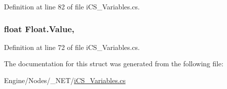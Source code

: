 Definition at line 82 of file i\+C\+S\+\_\+\+Variables.\+cs.

\hypertarget{struct_float_abf7787573f5748d6b7d6fdea53295c9f}{
\subsubsection[{Value}]{\setlength{\rightskip}{0pt plus 5cm}float Float.\+Value\hspace{0.3cm}{\ttfamily [get]}, {\ttfamily [set]}}}\label{struct_float_abf7787573f5748d6b7d6fdea53295c9f}


Definition at line 72 of file i\+C\+S\+\_\+\+Variables.\+cs.



The documentation for this struct was generated from the following file\+:\begin{DoxyCompactItemize}
\item 
Engine/\+Nodes/\+\_\+\+N\+E\+T/\hyperlink{i_c_s___variables_8cs}{i\+C\+S\+\_\+\+Variables.\+cs}\end{DoxyCompactItemize}
